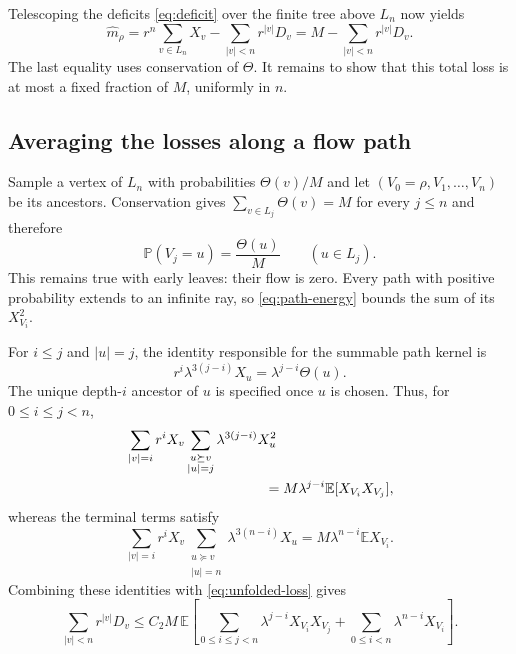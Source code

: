 \documentclass[11pt]{article}
\numberwithin{equation}{section}
\newcommand{\E}{\mathbb E}
\newcommand{\Prob}{\mathbb P}
\begin{document}
Telescoping the deficits \eqref{eq:deficit} over the finite tree
above $L_n$ now yields
\begin{equation}\label{eq:loss-telescope}
 \widehat m_\rho
 =r^n\sum_{v\in L_n}X_v
       -\sum_{|v|<n}r^{|v|}D_v
 =M-\sum_{|v|<n}r^{|v|}D_v.
\end{equation}
The last equality uses conservation of $\Theta$. It remains to
show that this total loss is at most a fixed fraction of $M$,
uniformly in $n$.

\subsection{Averaging the losses along a flow path}

Sample a vertex of $L_n$ with probabilities $\Theta(v)/M$ and
let $(V_0=\rho,V_1,\ldots,V_n)$ be its ancestors. Conservation
gives $\sum_{v\in L_j}\Theta(v)=M$ for every $j\leq n$ and
therefore
\begin{equation}\label{eq:path-marginals}
 \Prob(V_j=u)=\frac{\Theta(u)}M\qquad (u\in L_j).
\end{equation}
This remains true with early leaves: their flow is zero. Every
path with positive probability extends to an infinite ray, so
\eqref{eq:path-energy} bounds the sum of its $X_{V_i}^2$.

For $i\leq j$ and $|u|=j$, the identity responsible for the
summable path kernel is
\begin{equation}\label{eq:weight-identity}
 r^i\lambda^{3(j-i)}X_u
       =\lambda^{j-i}\Theta(u).
\end{equation}
The unique depth-$i$ ancestor of $u$ is specified once $u$ is
chosen. Thus, for $0\leq i\leq j<n$,
\begin{align}
 &\sum_{|v|=i}r^iX_v
       \sum_{\substack{u\succeq v\\|u|=j}}
                      \lambda^{3(j-i)}X_u^2\notag\\
 &\hspace{35mm}=M\lambda^{j-i}\E[X_{V_i}X_{V_j}],
       \label{eq:internal-path-sum}
\end{align}
whereas the terminal terms satisfy
\begin{equation}\label{eq:terminal-path-sum}
 \sum_{|v|=i}r^iX_v
       \sum_{\substack{u\succeq v\\|u|=n}}
                      \lambda^{3(n-i)}X_u
 =M\lambda^{n-i}\E X_{V_i}.
\end{equation}
Combining these identities with \eqref{eq:unfolded-loss} gives
\begin{equation}\label{eq:total-path-loss}
 \sum_{|v|<n}r^{|v|}D_v
 \leq C_2M\,\E\left[
       \sum_{0\leq i\leq j<n}\lambda^{j-i}X_{V_i}X_{V_j}
       +\sum_{0\leq i<n}\lambda^{n-i}X_{V_i}
                        \right].
\end{equation}
\end{document}
